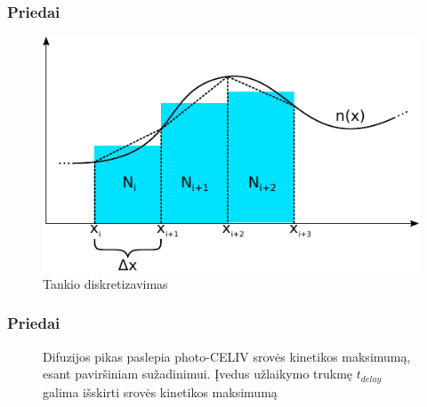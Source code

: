 \documentclass{beamer}
\begin{document}
  \begin{frame}
  \frametitle{Priedai}
  \begin{figure}
  \centering
    \includegraphics[scale=0.9]{./media/pdf/il1}
  \caption{Tankio diskretizavimas}
  \end{figure}
  \end{frame}
  
  \begin{frame}
  \frametitle{Priedai}
  \begin{figure}
  \centering
  \caption{Difuzijos pikas paslepia photo-CELIV srovės kinetikos maksimumą, esant paviršiniam sužadinimui. Įvedus užlaikymo trukmę $t_{delay}$ galima išskirti srovės kinetikos maksimumą}

	\end{figure}
  \end{frame}
  
\end{document}
